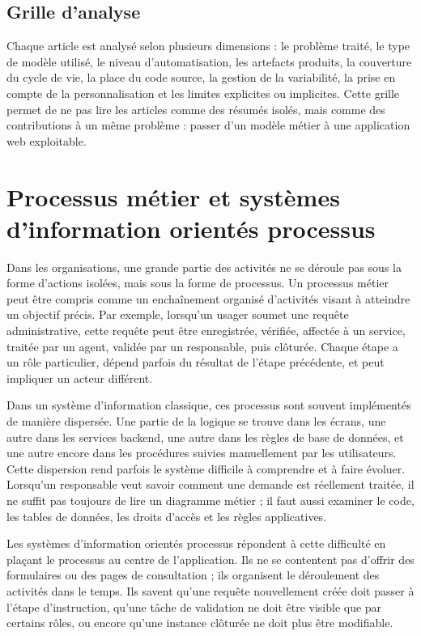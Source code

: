\documentclass[12pt,a4paper]{article}
\begin{document}
\subsection{Grille d'analyse}

Chaque article est analysé selon plusieurs dimensions : le problème traité, le type de modèle utilisé, le niveau d'automatisation, les artefacts produits, la couverture du cycle de vie, la place du code source, la gestion de la variabilité, la prise en compte de la personnalisation et les limites explicites ou implicites. Cette grille permet de ne pas lire les articles comme des résumés isolés, mais comme des contributions à un même problème : passer d'un modèle métier à une application web exploitable.

\section{Processus métier et systèmes d'information orientés processus}

Dans les organisations, une grande partie des activités ne se déroule pas sous la forme d'actions isolées, mais sous la forme de processus. Un processus métier peut être compris comme un enchaînement organisé d'activités visant à atteindre un objectif précis. Par exemple, lorsqu'un usager soumet une requête administrative, cette requête peut être enregistrée, vérifiée, affectée à un service, traitée par un agent, validée par un responsable, puis clôturée. Chaque étape a un rôle particulier, dépend parfois du résultat de l'étape précédente, et peut impliquer un acteur différent.

Dans un système d'information classique, ces processus sont souvent implémentés de manière dispersée. Une partie de la logique se trouve dans les écrans, une autre dans les services backend, une autre dans les règles de base de données, et une autre encore dans les procédures suivies manuellement par les utilisateurs. Cette dispersion rend parfois le système difficile à comprendre et à faire évoluer. Lorsqu'un responsable veut savoir comment une demande est réellement traitée, il ne suffit pas toujours de lire un diagramme métier ; il faut aussi examiner le code, les tables de données, les droits d'accès et les règles applicatives.

Les systèmes d'information orientés processus répondent à cette difficulté en plaçant le processus au centre de l'application. Ils ne se contentent pas d'offrir des formulaires ou des pages de consultation ; ils organisent le déroulement des activités dans le temps. Ils savent qu'une requête nouvellement créée doit passer à l'étape d'instruction, qu'une tâche de validation ne doit être visible que par certains rôles, ou encore qu'une instance clôturée ne doit plus être modifiable.
\end{document}
